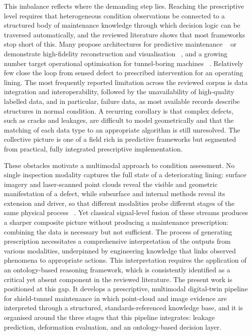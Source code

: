 \documentclass[preprint,12pt,authoryear]{elsarticle}
\begin{document}
This imbalance reflects where the demanding step lies. Reaching the
prescriptive level requires that heterogeneous condition observations be
connected to a structured body of maintenance knowledge through which
decision logic can be traversed automatically, and the reviewed
literature shows that most frameworks stop short of this. Many propose
architectures for predictive maintenance ~\citep{Khan2025, Zhao2024}
or demonstrate high-fidelity reconstruction and visualisation ~\citep{Cui2026, Fang2024}, and a growing number target operational
optimisation for tunnel-boring machines ~\citep{Yang2026}. Relatively
few close the loop from sensed defect to prescribed intervention for an
operating lining. The most frequently reported limitation across the
reviewed corpus is data integration and interoperability, followed by
the unavailability of high-quality labelled data, and in particular,
failure data, as most available records describe structures in normal
condition. A recurring corollary is that complex defects, such as cracks
and leakages, are difficult to model geometrically and that the matching
of each data type to an appropriate algorithm is still unresolved. The
collective picture is one of a field rich in predictive frameworks but
segmented from practical, fully integrated prescriptive implementation.

These obstacles motivate a multimodal approach to condition assessment.
No single inspection modality captures the full state of a deteriorating
lining: surface imagery and laser-scanned point clouds reveal the
visible and geometric manifestation of a defect, while subsurface and
internal methods reveal its extension and driver, so that different
modalities probe different stages of the same physical process ~\citep{He2024, Zhu2025}. Yet classical signal-level fusion of these
streams produces a sharper composite picture without producing a
maintenance prescription: combining the data is necessary but not
sufficient. The process of generating prescription necessitates a
comprehensive interpretation of the outputs from various modalities,
underpinned by engineering knowledge that links observed phenomena to
appropriate actions. This interpretation requires the application of an
ontology-based reasoning framework, which is consistently identified as
a critical yet absent component in the reviewed literature. The present
work is positioned at this gap. It develops a prescriptive, multimodal
digital-twin pipeline for shield-tunnel maintenance in which point-cloud
and image evidence are interpreted through a structured,
standards-referenced knowledge base, and it is organised around the
three stages that this pipeline integrates: leakage prediction,
deformation evaluation, and an ontology-based decision layer.
\end{document}
